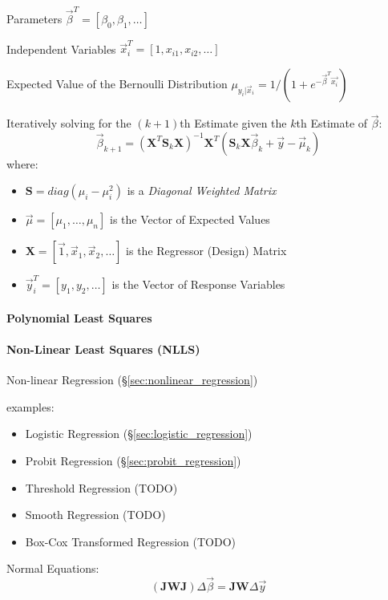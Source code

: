 Parameters $\vec{\beta}^T = [\beta_0, \beta_1, \ldots]$

Independent Variables $\vec{x}_i^T = [1, x_{i1}, x_{i2}, \ldots]$

Expected Value of the Bernoulli Distribution
$\mu_{y_i | \vec{x}_i} = 1 / (1 + e^{-\vec{\beta}^T \vec{x_i}})$

Iteratively solving for the $(k+1)$th Estimate given the $k$th Estimate of
$\vec{\beta}$:
\[
  \vec{\beta}_{k+1} = (\mathbf{X}^T \mathbf{S}_k \mathbf{X})^{-1} \mathbf{X}^T
    (\mathbf{S}_k \mathbf{X} \vec{\beta}_k + \vec{y} - \vec{\mu}_k)
\]
where:
\begin{itemize}
  \item $\mathbf{S} = diag(\mu_i - \mu_i^2)$ is a
    \emph{Diagonal Weighted Matrix}
  \item $\vec{\mu} = [\mu_1, \ldots, \mu_n]$ is the Vector of Expected Values
  \item $\mathbf{X} = [\vec{1}, \vec{x}_1, \vec{x}_2, \ldots]$ is the Regressor
    (Design) Matrix
  \item $\vec{y}_i^T = [y_1, y_2, \ldots]$ is the Vector of Response Variables
\end{itemize}



\paragraph{Polynomial Least Squares}\label{sec:polynomial_least_squares}\hfill

\paragraph{Non-Linear Least Squares (NLLS)}\label{sec:nlls}\hfill

Non-linear Regression (\S\ref{sec:nonlinear_regression})

examples:
\begin{itemize}
  \item Logistic Regression (\S\ref{sec:logistic_regression})
  \item Probit Regression (\S\ref{sec:probit_regression})
  \item Threshold Regression (TODO)
  \item Smooth Regression (TODO)
  \item Box-Cox Transformed Regression (TODO)
\end{itemize}

Normal Equations:
\[
  (\mathbf{J} \mathbf{W J}) \Delta \vec{\beta} =
    \mathbf{J} \mathbf{W} \Delta \vec{y}
\]



